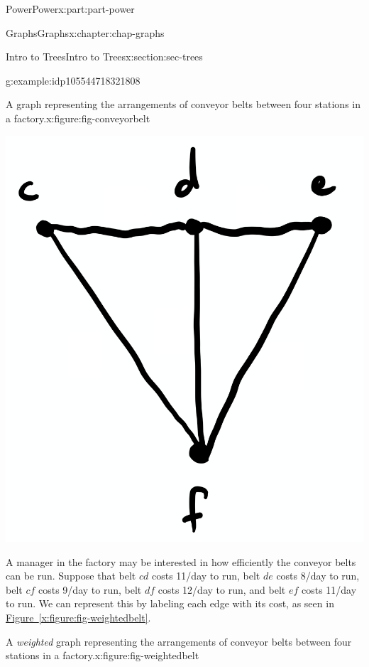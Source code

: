 \documentclass[oneside,10pt,]{book}
\newcommand{\xreffont}{\relax}
\numberwithin{equation}{section}
\begin{document}
\begin{partptx}{Power}{}{Power}{}{}{x:part:part-power}
\begin{chapterptx}{Graphs}{}{Graphs}{}{}{x:chapter:chap-graphs}
\begin{sectionptx}{Intro to Trees}{}{Intro to Trees}{}{}{x:section:sec-trees}
\begin{example}{}{g:example:idp105544718321808}
\begin{figureptx}{A graph representing the arrangements of conveyor belts between four stations in a factory.}{x:figure:fig-conveyorbelt}{}
\begin{image}{0.25}{0.5}{0.25}
\includegraphics[width=\linewidth]{images/graph06.png}
\end{image}%
\tcblower
\end{figureptx}%
A manager in the factory may be interested in how efficiently the conveyor belts can be run. Suppose that belt \(cd\) costs \textdollar{}11\slash{}day to run, belt \(de\) costs \textdollar{}8\slash{}day to run, belt \(cf\) costs \textdollar{}9\slash{}day to run, belt \(df\) costs \textdollar{}12\slash{}day to run, and belt \(ef\) costs \textdollar{}11\slash{}day to run. We can represent this by labeling each edge with its cost, as seen in \hyperref[x:figure:fig-weightedbelt]{Figure~{\xreffont\ref{x:figure:fig-weightedbelt}}}.%
\begin{figureptx}{A \emph{weighted} graph representing the arrangements of conveyor belts between four stations in a factory.}{x:figure:fig-weightedbelt}{}%
\begin{image}{0.25}{0.5}{0.25}%

\end{image}
\end{figureptx}
\end{example}
\end{sectionptx}
\end{chapterptx}
\end{partptx}
\end{document}
